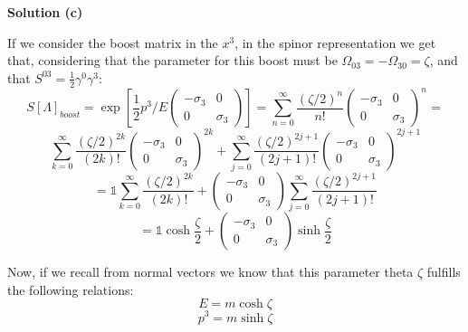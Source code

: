 \documentclass[12pt]{article}
\begin{document}
\color{blue}

\textbf{Solution (c)}

If we consider the boost matrix in the $x^3$, in the spinor representation we get that, considering that the parameter for  this boost must be $\Omega_{03}=-\Omega_{30}=\zeta$, and that $S^{03}= \frac{1}{2}\gamma^0\gamma^3$:
\[
    S[\Lambda]_{boost}=\exp{\left[\frac{1}{2}p^3/E
    \begin{pmatrix}
        -\sigma_3 & 0 \\
        0 & \sigma_3
\end{pmatrix}\right]} = \sum_{n=0}^\infty \frac{(\zeta/2)^n}{n!}\begin{pmatrix}
        -\sigma_3 & 0 \\
        0 & \sigma_3
    \end{pmatrix}^n = 
\]
\[
    \sum_{k=0}^\infty \frac{(\zeta/2)^{2k}}{(2k)!}\begin{pmatrix}
        -\sigma_3 & 0 \\
        0 & \sigma_3
        \end{pmatrix}^{2k} + \sum_{j=0}^\infty \frac{(\zeta/2)^{2j+1}}{(2j+1)!}\begin{pmatrix}
        -\sigma_3 & 0 \\
        0 & \sigma_3
    \end{pmatrix}^{2j+1} 
\]
\[
    = \mathbb{1}\sum_{k=0}^\infty \frac{(\zeta/2)^{2k}}{(2k)!} + \begin{pmatrix}
        -\sigma_3 & 0 \\
        0 & \sigma_3
    \end{pmatrix}\sum_{j=0}^\infty \frac{(\zeta/2)^{2j+1}}{(2j+1)!}
\]
\[
    = \mathbb{1}\cosh{\frac{\zeta}{2}} + \begin{pmatrix}
        -\sigma_3 & 0 \\
        0 & \sigma_3
    \end{pmatrix}\sinh{\frac{\zeta}{2}}
\]

Now, if we recall from normal vectors we know that this parameter theta $\zeta$ fulfills the following relations:
\[
    E = m\cosh{\zeta}
\]
\[
    p^3 = m\sinh{\zeta}
\]
\end{document}
